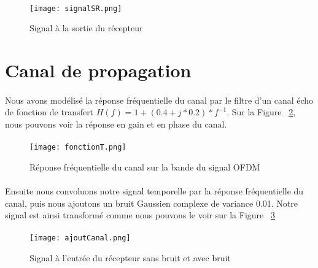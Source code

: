 \paragraph{}
\vspace{1\baselineskip}
\begin{figure}[!h]
  \centering
  \texttt{[image: signalSR.png]}
  \caption{Signal à la sortie du récepteur }
	\label{signal} 
\end{figure}
\vspace{1\baselineskip}

\section{Canal de propagation}
\paragraph{}
Nous avons modélisé la réponse fréquentielle du canal par le filtre d'un canal écho de fonction de transfert $H(f)=1+(0.4+j*0.2)*f^{-1}$. Sur la Figure ~\ref{fonctionT}, nous pouvons voir la réponse en gain et en phase du canal.
\paragraph{}
\vspace{1\baselineskip}
\begin{figure}[!h]
  \centering
  \texttt{[image: fonctionT.png]}
  \caption{Réponse fréquentielle du canal sur la bande du signal OFDM}
	\label{fonctionT} 
\end{figure}
\vspace{1\baselineskip}
\paragraph{}
Ensuite nous convoluons notre signal temporelle par la réponse fréquentielle du canal, puis nous ajoutons un bruit Gaussien complexe de variance 0.01. Notre signal est ainsi transformé comme nous pouvons le voir sur la Figure ~\ref{ajoutCanal} 
\paragraph{}
\vspace{1\baselineskip}
\begin{figure}[!h]
  \centering
  \texttt{[image: ajoutCanal.png]}
  \caption{Signal à l'entrée du récepteur sans bruit et avec bruit}
	\label{ajoutCanal} 
\end{figure}
\vspace{1\baselineskip}


